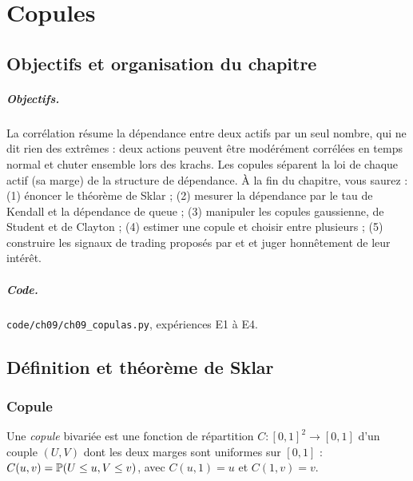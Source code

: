 \chapter{Copules}
\label{ch:9}

\section{Objectifs et organisation du chapitre}

\paragraph{Objectifs.} La corrélation résume la dépendance entre deux actifs par un seul nombre, qui ne dit rien des extrêmes : deux actions peuvent être modérément corrélées en temps normal et chuter ensemble lors des krachs. Les copules séparent la loi de chaque actif (sa \og marge\fg) de la structure de dépendance. À la fin du chapitre, vous saurez : (1) énoncer le théorème de Sklar ; (2) mesurer la dépendance par le tau de Kendall et la dépendance de queue ; (3) manipuler les copules gaussienne, de Student et de Clayton ; (4) estimer une copule et choisir entre plusieurs ; (5) construire les signaux de trading proposés par \citet{liewwu2013} et \citet{xie2016} et juger honnêtement de leur intérêt.

\paragraph{Code.} \texttt{code/ch09/ch09\_copulas.py}, expériences E1 à E4.

\section{Définition et théorème de Sklar}

\subsection{Copule}

\begin{definition}
Une \emph{copule} bivariée est une fonction de répartition $C : [0,1]^2\to[0,1]$ d'un couple $(U,V)$ dont les deux marges sont uniformes sur $[0,1]$ : $C(u,v) = \mathbb{P}(U\le u, V\le v)$, avec $C(u,1) = u$ et $C(1,v) = v$.
\end{definition}


